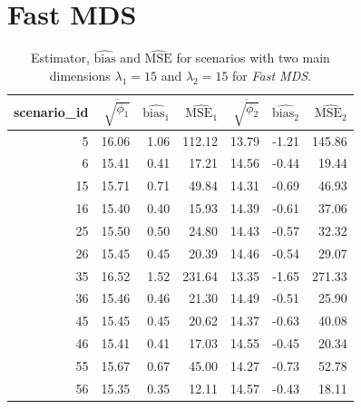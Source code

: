 \documentclass[11pt]{report}
\begin{document}
\FloatBarrier

\newpage
\section{Fast MDS}
\label{mse_fast}


\begin{table}[ht]
\centering
\begin{tabular}{rrrrrrr}
scenario\_id & $\overline{\sqrt{\phi_1}}$ & $\widehat{\mbox{bias}_1}$ & $\widehat{\mbox{MSE}_1}$ & $\overline{\sqrt{\phi_2}}$ & $\widehat{\mbox{bias}_2}$ & $\widehat{\mbox{MSE}_2}$ \\ 
  \hline
  5 & 16.06 & 1.06 & 112.12 & 13.79 & -1.21 & 145.86 \\ 
  6 & 15.41 & 0.41 & 17.21 & 14.56 & -0.44 & 19.44 \\ 
  15 & 15.71 & 0.71 & 49.84 & 14.31 & -0.69 & 46.93 \\ 
  16 & 15.40 & 0.40 & 15.93 & 14.39 & -0.61 & 37.06 \\ 
  25 & 15.50 & 0.50 & 24.80 & 14.43 & -0.57 & 32.32 \\ 
  26 & 15.45 & 0.45 & 20.39 & 14.46 & -0.54 & 29.07 \\ 
  35 & 16.52 & 1.52 & 231.64 & 13.35 & -1.65 & 271.33 \\ 
  36 & 15.46 & 0.46 & 21.30 & 14.49 & -0.51 & 25.90 \\ 
  45 & 15.45 & 0.45 & 20.62 & 14.37 & -0.63 & 40.08 \\ 
  46 & 15.41 & 0.41 & 17.03 & 14.55 & -0.45 & 20.34 \\ 
  55 & 15.67 & 0.67 & 45.00 & 14.27 & -0.73 & 52.78 \\ 
  56 & 15.35 & 0.35 & 12.11 & 14.57 & -0.43 & 18.11 \\ 
   \hline
\end{tabular}
\caption{Estimator, $\widehat{\mbox{bias}}$ and $\widehat{\mbox{MSE}}$ for scenarios with two main dimensions $\lambda_1 = 15$ and $\lambda_2 = 15$ for \textit{Fast MDS}.}
\end{table}

\FloatBarrier
\end{document}
